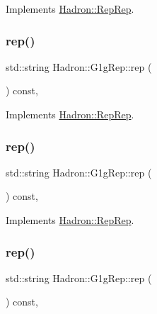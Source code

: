 Implements \mbox{\hyperlink{structHadron_1_1RepRep_ab3213025f6de249f7095892109575fde}{Hadron\+::\+Rep\+Rep}}.

\mbox{\label{structHadron_1_1G1gRep_ad03cbfd3310a65b26937f01ebaa044dd}} 
\subsubsection{\texorpdfstring{rep()}{rep()}\hspace{0.1cm}{\footnotesize\ttfamily [2/5]}}
{\footnotesize\ttfamily std\+::string Hadron\+::\+G1g\+Rep\+::rep (\begin{DoxyParamCaption}{ }\end{DoxyParamCaption}) const\hspace{0.3cm}{\ttfamily [inline]}, {\ttfamily [virtual]}}



Implements \mbox{\hyperlink{structHadron_1_1RepRep_ab3213025f6de249f7095892109575fde}{Hadron\+::\+Rep\+Rep}}.

\mbox{\label{structHadron_1_1G1gRep_ad03cbfd3310a65b26937f01ebaa044dd}} 
\subsubsection{\texorpdfstring{rep()}{rep()}\hspace{0.1cm}{\footnotesize\ttfamily [3/5]}}
{\footnotesize\ttfamily std\+::string Hadron\+::\+G1g\+Rep\+::rep (\begin{DoxyParamCaption}{ }\end{DoxyParamCaption}) const\hspace{0.3cm}{\ttfamily [inline]}, {\ttfamily [virtual]}}



Implements \mbox{\hyperlink{structHadron_1_1RepRep_ab3213025f6de249f7095892109575fde}{Hadron\+::\+Rep\+Rep}}.

\mbox{\label{structHadron_1_1G1gRep_ad03cbfd3310a65b26937f01ebaa044dd}} 
\subsubsection{\texorpdfstring{rep()}{rep()}\hspace{0.1cm}{\footnotesize\ttfamily [4/5]}}
{\footnotesize\ttfamily std\+::string Hadron\+::\+G1g\+Rep\+::rep (\begin{DoxyParamCaption}{ }\end{DoxyParamCaption}) const\hspace{0.3cm}{\ttfamily [inline]}, {\ttfamily [virtual]}}




